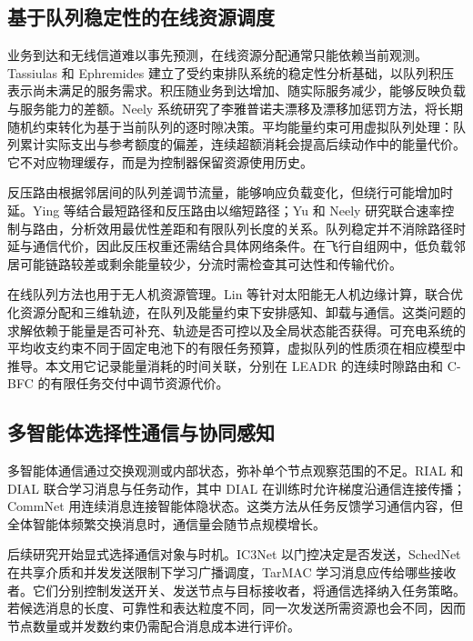 \subsection{基于队列稳定性的在线资源调度}

业务到达和无线信道难以事先预测，在线资源分配通常只能依赖当前观测。Tassiulas 和 Ephremides 建立了受约束排队系统的稳定性分析基础，以队列积压表示尚未满足的服务需求\cite{tassiulas1992stability}。积压随业务到达增加、随实际服务减少，能够反映负载与服务能力的差额。Neely 系统研究了李雅普诺夫漂移及漂移加惩罚方法，将长期随机约束转化为基于当前队列的逐时隙决策\cite{neely2010stochastic}。平均能量约束可用虚拟队列处理：队列累计实际支出与参考额度的偏差，连续超额消耗会提高后续动作中的能量代价。它不对应物理缓存，而是为控制器保留资源使用历史。

反压路由根据邻居间的队列差调节流量，能够响应负载变化，但绕行可能增加时延。Ying 等结合最短路径和反压路由以缩短路径\cite{related2}；Yu 和 Neely 研究联合速率控制与路由，分析效用最优性差距和有限队列长度的关系\cite{algo1}。队列稳定并不消除路径时延与通信代价，因此反压权重还需结合具体网络条件。在飞行自组网中，低负载邻居可能链路较差或剩余能量较少，分流时需检查其可达性和传输代价。

在线队列方法也用于无人机资源管理。Lin 等针对太阳能无人机边缘计算，联合优化资源分配和三维轨迹，在队列及能量约束下安排感知、卸载与通信\cite{intro2}。这类问题的求解依赖于能量是否可补充、轨迹是否可控以及全局状态能否获得。可充电系统的平均收支约束不同于固定电池下的有限任务预算，虚拟队列的性质须在相应模型中推导。本文用它记录能量消耗的时间关联，分别在 LEADR 的连续时隙路由和 C-BFC 的有限任务交付中调节资源代价。

\subsection{多智能体选择性通信与协同感知}

多智能体通信通过交换观测或内部状态，弥补单个节点观察范围的不足。RIAL 和 DIAL 联合学习消息与任务动作，其中 DIAL 在训练时允许梯度沿通信连接传播\cite{rial-dial}；CommNet 用连续消息连接智能体隐状态\cite{commnet}。这类方法从任务反馈学习通信内容，但全体智能体频繁交换消息时，通信量会随节点规模增长。

后续研究开始显式选择通信对象与时机。IC3Net 以门控决定是否发送\cite{ic3net}，SchedNet 在共享介质和并发发送限制下学习广播调度\cite{schednet}，TarMAC 学习消息应传给哪些接收者\cite{tarmac}。它们分别控制发送开关、发送节点与目标接收者，将通信选择纳入任务策略。若候选消息的长度、可靠性和表达粒度不同，同一次发送所需资源也会不同，因而节点数量或并发数约束仍需配合消息成本进行评价。

